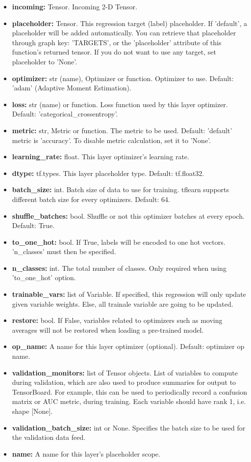 \begin{itemize}
    \item \textbf{incoming:} Tensor. Incoming 2-D Tensor.
    \item \textbf{placeholder:} Tensor. This regression target (label) placeholder. If 'default', a placeholder will be added automatically. You can retrieve that placeholder through graph key: 'TARGETS', or the 'placeholder' attribute of this function's returned tensor. If you do not want to use any target, set placeholder to 'None'.
    \item \textbf{optimizer:} str (name), Optimizer or function. Optimizer to use. Default: 'adam' (Adaptive Moment Estimation).
    \item \textbf{loss:} str (name) or function. Loss function used by this layer optimizer. Default: 'categorical\_crossentropy'.
    \item \textbf{metric:} str, Metric or function. The metric to be used. Default: 'default' metric is 'accuracy'. To disable metric calculation, set it to 'None'.
    \item \textbf{learning\_rate:} float. This layer optimizer's learning rate.
    \item \textbf{dtype:} tf.types. This layer placeholder type. Default: tf.float32.
    \item \textbf{batch\_size:} int. Batch size of data to use for training. tflearn supports different batch size for every optimizers. Default: 64.
    \item \textbf{shuffle\_batches:} bool. Shuffle or not this optimizer batches at every epoch. Default: True.
    \item \textbf{to\_one\_hot:} bool. If True, labels will be encoded to one hot vectors. 'n\_classes' must then be specified.
    \item \textbf{n\_classes:} int. The total number of classes. Only required when using 'to\_one\_hot' option.
    \item \textbf{trainable\_vars:} list of Variable. If specified, this regression will only update given variable weights. Else, all trainale variable are going to be updated.
    \item \textbf{restore:} bool. If False, variables related to optimizers such as moving averages will not be restored when loading a pre-trained model.
    \item \textbf{op\_name:} A name for this layer optimizer (optional). Default: optimizer op name.
    \item \textbf{validation\_monitors:} list of Tensor objects. List of variables to compute during validation, which are also used to produce summaries for output to TensorBoard. For example, this can be used to periodically record a confusion matrix or AUC metric, during training. Each variable should have rank 1, i.e. shape [None].
    \item \textbf{validation\_batch\_size:} int or None. Specifies the batch size to be used for the validation data feed.
    \item \textbf{name:} A name for this layer's placeholder scope.    
\end{itemize}


